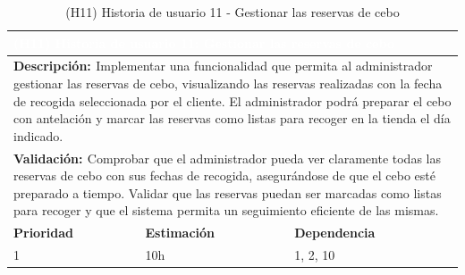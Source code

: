 \begin{table}[H]
  \centering
  \renewcommand{\arraystretch}{1.5}
  \begin{tabular}{|p{}|p{}|p{}|}
    \hline
    \multicolumn{3}{|l|}{\cellcolor{OrangeVIU}\textcolor{white}{\textbf{(H11) Historia de usuario 11: Gestionar las reservas de cebo}}} \\
    \hline
    \multicolumn{3}{|p{\dimexpr0.9\linewidth+2\tabcolsep+2\arrayrulewidth}|}{{\textbf{\textcolor{naranja}{Descripción: }}}Implementar una funcionalidad que permita al administrador gestionar las reservas de cebo, visualizando las reservas realizadas con la fecha de recogida seleccionada por el cliente. El administrador podrá preparar el cebo con antelación y marcar las reservas como listas para recoger en la tienda el día indicado.} \\
    \hline
    \multicolumn{3}{|p{\dimexpr0.9\linewidth+2\tabcolsep+2\arrayrulewidth}|}{{\textbf{\textcolor{naranja}{Validación: }} Comprobar que el administrador pueda ver claramente todas las reservas de cebo con sus fechas de recogida, asegurándose de que el cebo esté preparado a tiempo. Validar que las reservas puedan ser marcadas como listas para recoger y que el sistema permita un seguimiento eficiente de las mismas.}} \\
    \hline
    {\textbf{\textcolor{naranja}{Prioridad }}}  & {\textbf{\textcolor{naranja}{Estimación }}}  & {\textbf{\textcolor{naranja}{Dependencia }}}  \\
    \hline
    1 &  10h &  1, 2, 10 \\
    \hline
  \end{tabular}
  \caption{(H11) Historia de usuario 11 - Gestionar las reservas de cebo}
  \label{table:H11}
\end{table}

